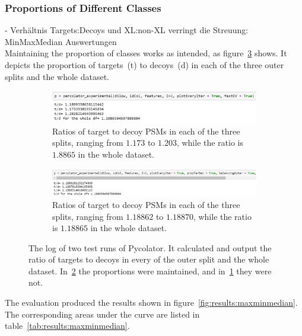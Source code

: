 \subsubsection{Proportions of Different Classes}
\label{lab:results:proportions}
- Verhältnis Targets:Decoys und XL:non-XL verringt die Streuung: MinMaxMedian Auswertungen\\
Maintaining the proportion of classes works as intended, as figure~\ref{fig:results:prop_code} shows. It depicts the proportion of targets~(t) to decoys~(d) in each of the three outer splits and the whole dataset.\\
\renewcommand{\baselinestretch}{0.9}
\begin{figure}
	\normalsize
	\centering
	\begin{subfigure}{\textwidth}
		\includegraphics[width = \textwidth]{figures/prop_not_kept_code.jpg}
		\caption{Ratios of target to decoy PSMs in each of the three splits, ranging from $1.173$ to $1.203$, while the ratio is $1.8865$ in the whole dataset.}
		\label{fig:results:prop_not_maintained}
	\end{subfigure}
	\begin{subfigure}{\textwidth}
		\includegraphics[width = \textwidth]{figures/prop_kept_code.jpg}
		\caption{Ratios of target to decoy PSMs in each of the three splits, ranging from $1.18862$ to $1.18870$, while the ratio is $1.18865$ in the whole dataset.}
		\label{fig:results:prop_maintained}
	\end{subfigure}
	\caption[Maintaining proportions works as intended]{The log of two test runs of Pycolator. It calculated and output the ratio of targets to decoys in every of the outer split and the whole dataset. In~\ref{fig:results:prop_maintained} the proportions were maintained, and in~\ref{fig:results:prop_not_maintained} they were not.}
	\label{fig:results:prop_code}
\end{figure}
\renewcommand{\baselinestretch}{1}
The evaluation produced the results shown in figure~\ref{fig:results:maxminmedian}. The corresponding areas under the curve are listed in table~\ref{tab:results:maxminmedian}.

